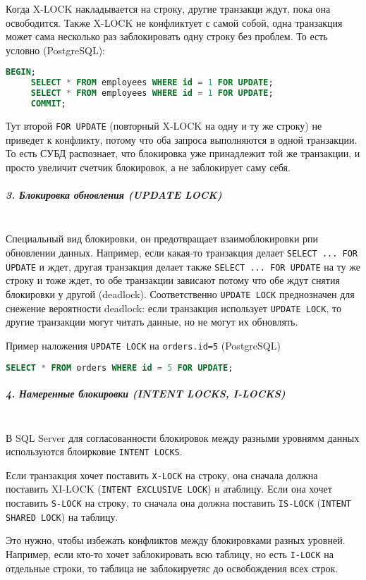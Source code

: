  Когда X-LOCK накладывается на строку, другие транзакци ждут, пока она освободится. Также X-LOCK не конфликтует с самой собой, одна транзакция может сама несколько раз заблокировать одну строку без проблем.
 То есть условно (PostgreSQL):
 \begin{lstlisting}[language=SQL]
     BEGIN;
     SELECT * FROM employees WHERE id = 1 FOR UPDATE;
     SELECT * FROM employees WHERE id = 1 FOR UPDATE;
     COMMIT;    
 \end{lstlisting}
 Тут второй \texttt{FOR UPDATE} (повторный X-LOCK на одну и ту же строку) не приведет к конфликту, потому что оба запроса выполняются в одной транзакции. То есть СУБД распознает, что блокировка уже принадлежит той же транзакции, и просто увеличит счетчик блокировок, а не заблокирует саму себя.
 
 \subparagraph{3. Блокировка обновления (UPDATE LOCK)} ~\\
 
 Специальный вид блокировки, он предотвращает взаимоблокировки рпи обновлении данных.
 Например, если какая-то транзакция делает \texttt{SELECT ... FOR UPDATE} и ждет, другая транзакция делает также \texttt{SELECT ... FOR UPDATE} на ту же строку и тоже ждет, то обе транзакции зависают потому что обе ждут снятия блокировки у другой (deadlock). 
 Соответственно \texttt{UPDATE LOCK} преднозначен для снежение вероятности deadlock: если транзакция использует \texttt{UPDATE LOCK}, то другие транзакции могут читать данные, но не могут их обновлять.
 
 Пример наложения \texttt{UPDATE LOCK} на \texttt{orders.id=5} (PostgreSQL)
 \begin{lstlisting}[language=SQL]
     SELECT * FROM orders WHERE id = 5 FOR UPDATE;
 \end{lstlisting}
 
 \subparagraph{4. Намеренные блокировки (INTENT LOCKS, I-LOCKS)} ~\\
 
 В SQL Server для согласованности блокировок между разными уровнямм данных используются блоирковие \texttt{INTENT LOCKS}. \autocite{MicrosoftLearnSQLserverTransLock}
 
 Если транзакция хочет поставить \texttt{X-LOCK} на строку, она сначала должна поставить XI-LOCK (\texttt{INTENT EXCLUSIVE LOCK}) н атаблицу. Если она хочет поставить \texttt{S-LOCK} на строку, то сначала она должна поставить \texttt{IS-LOCK} (\texttt{INTENT SHARED LOCK}) на таблицу.
 
 Это нужно, чтобы избежать конфликтов между блокировками разных уровней. Например, если кто-то хочет заблокировать всю таблицу, но есть \texttt{I-LOCK} на отдельные строки, то таблица не заблокируетяс до освобождения всех строк.
 

